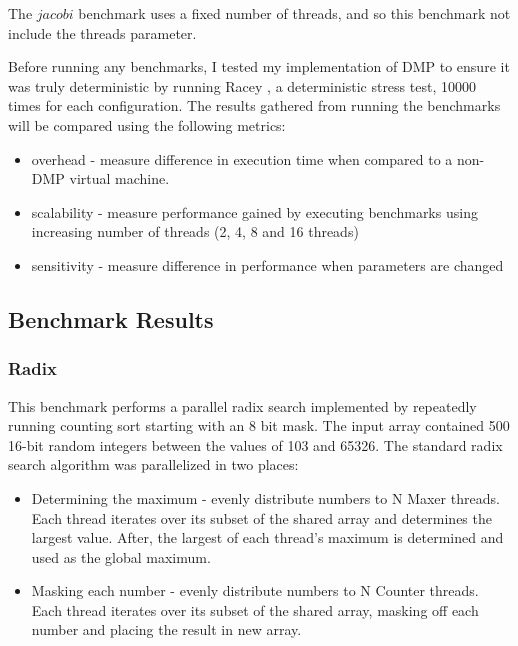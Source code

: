 The $jacobi$ benchmark uses a fixed number of threads, and so this
benchmark not include the threads parameter.

Before running any benchmarks, I tested my implementation of DMP to
ensure it was truly deterministic by running Racey \cite{racey}, a
deterministic stress test, 10000 times for each configuration.  The
results gathered from running the benchmarks will be compared using
the following metrics:

\begin{itemize}
\item overhead - measure difference in execution time when compared to
  a non-DMP virtual machine.

\item scalability - measure performance gained by executing benchmarks
  using increasing number of threads (2, 4, 8 and 16 threads)

\item sensitivity - measure difference in performance when parameters
  are changed
\end{itemize}

\subsection{Benchmark Results}

\subsubsection{Radix}

This benchmark performs a parallel radix search implemented by
repeatedly running counting sort starting with an 8 bit mask.  The
input array contained 500 16-bit random integers between the values of
103 and 65326.  The standard radix search algorithm was parallelized
in two places:

\begin{itemize}
\item Determining the maximum - evenly distribute numbers to N Maxer
  threads.  Each thread iterates over its subset of the shared array
  and determines the largest value.  After, the largest of each
  thread's maximum is determined and used as the global maximum.

\item Masking each number - evenly distribute numbers to N Counter
  threads.  Each thread iterates over its subset of the shared array,
  masking off each number and placing the result in new array.
\end{itemize}

